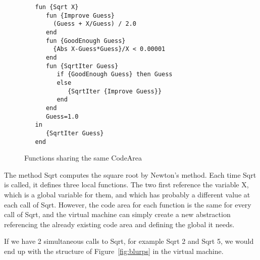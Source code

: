 \documentclass[a4paper]{memoir}
\begin{document}

\begin{figure}[h]
\begin{lstlisting}
   fun {Sqrt X}
      fun {Improve Guess}
        (Guess + X/Guess) / 2.0
      end
      fun {GoodEnough Guess}
        {Abs X-Guess*Guess}/X < 0.00001
      end
      fun {SqrtIter Guess}
         if {GoodEnough Guess} then Guess
         else
            {SqrtIter {Improve Guess}}
         end
      end
      Guess=1.0
   in
      {SqrtIter Guess}
   end
\end{lstlisting}
\caption{Functions sharing the same CodeArea}
\label{fig:code_area_sharing}
\end{figure}

The method Sqrt computes the square root by Newton's method. Each time Sqrt is
called, it defines three local functions. The two first reference the variable
X, which is a global variable for them, and which has probably a different
value at each call of Sqrt. However, the code area for each function is the
same for every call of Sqrt, and the virtual machine can simply create a new
abstraction referencing the already existing code area and defining the global
it needs. 

If we have 2 simultaneous calls to Sqrt, for example {Sqrt 2} and {Sqrt 5}, we
would end up with the structure of Figure~\ref{fig:blurps} 
in the virtual machine.
\end{document}
